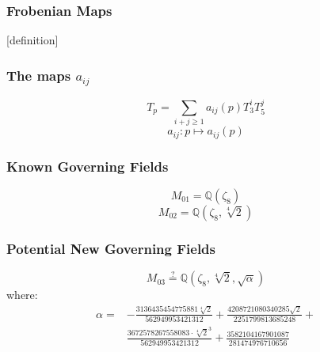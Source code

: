 \documentclass[12pt]{beamer}
\begin{document}
	\begin{frame}
		\frametitle{Frobenian Maps}
		[definition]
	\end{frame}
	\begin{frame}
		\frametitle{The maps $a_{ij}$}
		$$T_p = \sum_{i+j \geq 1} a_{ij}(p) T_3^iT_5^j$$
		\vspace{1cm}
		$$a_{ij}: p \mapsto a_{ij}(p)$$
	\end{frame}
	\begin{frame}
		\frametitle{Known Governing Fields}
		$$M_{01} = \mathbb{Q}\left(\zeta_8\right)$$
		$$M_{02} = \mathbb{Q}\left(\zeta_8, \sqrt[4]{2}\right)$$
	\end{frame}
	\begin{frame}
		\frametitle{Potential New Governing Fields}
		$$M_{03} \stackrel{?}{=} \mathbb{Q}\left(\zeta_8, \sqrt[4]{2}, \sqrt{\alpha}\right)$$
		where:
		\begin{align*}
			\alpha =
			&- \frac{3136435454775881 \sqrt[4]{2}}{562949953421312} + \frac{4208721080340285 \sqrt{2}}{2251799813685248} +\\
			&\frac{3672578267558083 \cdot \sqrt[4]{2}^3}{562949953421312} + \frac{3582104167901087}{281474976710656}
		\end{align*}
	\end{frame}
\end{document}
